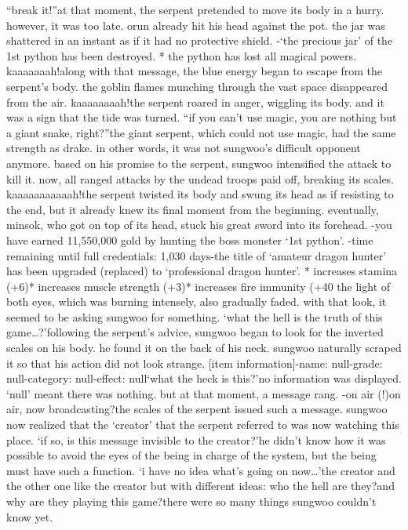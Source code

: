 “break it!”at that moment, the serpent pretended to move its body in a hurry.
 however, it was too late.
orun already hit his head against the pot.
 the jar was shattered in an instant as if it had no protective shield.
-‘the precious jar’ of the 1st python has been destroyed.
* the python has lost all magical powers.
kaaaaaaah!along with that message, the blue energy began to escape from the serpent’s body.
 the goblin flames munching through the vast space disappeared from the air.
kaaaaaaaah!the serpent roared in anger, wiggling its body.
 and it was a sign that the tide was turned.
“if you can’t use magic, you are nothing but a giant snake, right?”the giant serpent, which could not use magic, had the same strength as drake.
in other words, it was not sungwoo’s difficult opponent anymore.
based on his promise to the serpent, sungwoo intensified the attack to kill it.
now, all ranged attacks by the undead troops paid off, breaking its scales.
kaaaaaaaaaaah!the serpent twisted its body and swung its head as if resisting to the end, but it already knew its final moment from the beginning.
eventually, minsok, who got on top of its head, stuck his great sword into its forehead.
-you have earned 11,550,000 gold by hunting the boss monster ‘1st python’.
-time remaining until full credentials: 1,030 days-the title of ‘amateur dragon hunter’ has been upgraded (replaced) to ‘professional dragon hunter’.
* increases stamina (+6)* increases muscle strength (+3)* increases fire immunity (+40%
 the light of both eyes, which was burning intensely, also gradually faded.
 with that look, it seemed to be asking sungwoo for something.
‘what the hell is the truth of this game…?’following the serpent’s advice, sungwoo began to look for the inverted scales on his body.
he found it on the back of his neck.
sungwoo naturally scraped it so that his action did not look strange.
[item information]-name: null-grade: null-category: null-effect: null‘what the heck is this?’no information was displayed.
 ‘null’ meant there was nothing.
but at that moment, a message rang.
-on air (!)on air, now broadcasting?the scales of the serpent issued such a message.
sungwoo now realized that the ‘creator’ that the serpent referred to was now watching this place.
‘if so, is this message invisible to the creator?’he didn’t know how it was possible to avoid the eyes of the being in charge of the system, but the being must have such a function.
‘i have no idea what’s going on now…’the creator and the other one like the creator but with different ideas: who the hell are they?and why are they playing this game?there were so many things sungwoo couldn’t know yet.


